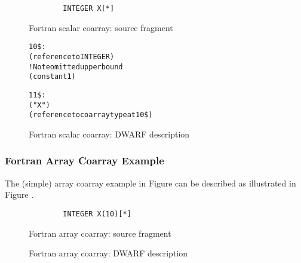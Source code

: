 \begin{figure}[!h]
\begin{lstlisting}
        INTEGER X[*]
\end{lstlisting}
\caption{Fortran scalar coarray: source fragment}
\label{fig:Fortranscalarcoarraysourcefragment}
\end{figure}

\begin{figure}[!h]
\begin{dwflisting}
\begin{alltt}
10\$:  \DWTAGcoarraytype
        \DWATtype(reference to INTEGER)
        \DWTAGsubrangetype                ! Note omitted upper bound			
            \DWATlowerbound(constant 1)

11\$:  \DWTAGvariable
        \DWATname("X")
        \DWATtype(reference to coarray type at 10\$)
\end{alltt}
\end{dwflisting}
\caption{Fortran scalar coarray: DWARF description}
\label{fig:FortranscalarcoarrayDWARFdescription}
\end{figure}

\subsubsection{Fortran Array Coarray Example}
The  (simple) array coarray example
in Figure  can be described as 
illustrated in Figure .

\begin{figure}[here]
\begin{lstlisting}
        INTEGER X(10)[*]
\end{lstlisting}
\caption{Fortran array coarray: source fragment}
\label{fig:Fortranarraycoarraysourcefragment}
\end{figure}

\begin{figure}[here]
\caption{Fortran array coarray: DWARF description}
\label{fig:FortranarraycoarrayDWARFdescription}
\end{figure}

